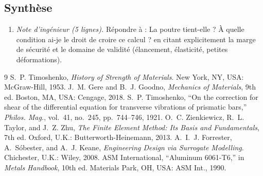 \documentclass[10pt,journal]{IEEEtran}
\begin{document}
\subsection{Synthèse}
\begin{enumerate}[leftmargin=1.4em]
\item \emph{Note d'ingénieur (5 lignes).} Répondre à : \og La poutre tient-elle ? À quelle condition ai-je le droit de croire ce calcul ?\fg{} en citant explicitement la marge de sécurité et le domaine de validité (élancement, élasticité, petites déformations).
\end{enumerate}

\begin{thebibliography}{9}
 S.~P. Timoshenko, \emph{History of Strength of Materials}. New York, NY, USA: McGraw-Hill, 1953.
 J.~M. Gere and B.~J. Goodno, \emph{Mechanics of Materials}, 9th ed. Boston, MA, USA: Cengage, 2018.
 S.~P. Timoshenko, ``On the correction for shear of the differential equation for transverse vibrations of prismatic bars,'' \emph{Philos. Mag.}, vol.~41, no.~245, pp.~744--746, 1921.
 O.~C. Zienkiewicz, R.~L. Taylor, and J.~Z. Zhu, \emph{The Finite Element Method: Its Basis and Fundamentals}, 7th ed. Oxford, U.K.: Butterworth-Heinemann, 2013.
 A.~I.~J. Forrester, A.~Sóbester, and A.~J. Keane, \emph{Engineering Design via Surrogate Modelling}. Chichester, U.K.: Wiley, 2008.
 ASM International, ``Aluminum 6061-T6,'' in \emph{Metals Handbook}, 10th ed. Materials Park, OH, USA: ASM Int., 1990.
\end{thebibliography}
\end{document}
